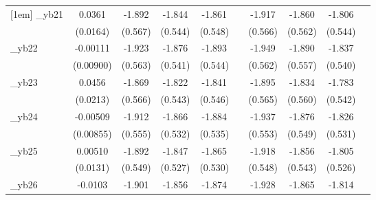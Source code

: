 \begin{table}[htbp]
\begin{tabular}{l*{9}{c}}
[1em]
\_yb21       &      0.0361\sym{**} &      -1.892\sym{***}&      -1.844\sym{***}&      -1.861\sym{***}&                     &      -1.917\sym{***}&      -1.860\sym{***}&      -1.806\sym{***}&                     \\
            &    (0.0164)         &     (0.567)         &     (0.544)         &     (0.548)         &                     &     (0.566)         &     (0.562)         &     (0.544)         &                     \\
[1em]
\_yb22       &    -0.00111         &      -1.923\sym{***}&      -1.876\sym{***}&      -1.893\sym{***}&                     &      -1.949\sym{***}&      -1.890\sym{***}&      -1.837\sym{***}&                     \\
            &   (0.00900)         &     (0.563)         &     (0.541)         &     (0.544)         &                     &     (0.562)         &     (0.557)         &     (0.540)         &                     \\
[1em]
\_yb23       &      0.0456\sym{**} &      -1.869\sym{***}&      -1.822\sym{***}&      -1.841\sym{***}&                     &      -1.895\sym{***}&      -1.834\sym{***}&      -1.783\sym{***}&                     \\
            &    (0.0213)         &     (0.566)         &     (0.543)         &     (0.546)         &                     &     (0.565)         &     (0.560)         &     (0.542)         &                     \\
[1em]
\_yb24       &    -0.00509         &      -1.912\sym{***}&      -1.866\sym{***}&      -1.884\sym{***}&                     &      -1.937\sym{***}&      -1.876\sym{***}&      -1.826\sym{***}&                     \\
            &   (0.00855)         &     (0.555)         &     (0.532)         &     (0.535)         &                     &     (0.553)         &     (0.549)         &     (0.531)         &                     \\
[1em]
\_yb25       &     0.00510         &      -1.892\sym{***}&      -1.847\sym{***}&      -1.865\sym{***}&                     &      -1.918\sym{***}&      -1.856\sym{***}&      -1.805\sym{***}&                     \\
            &    (0.0131)         &     (0.549)         &     (0.527)         &     (0.530)         &                     &     (0.548)         &     (0.543)         &     (0.526)         &                     \\
[1em]
\_yb26       &     -0.0103         &      -1.901\sym{***}&      -1.856\sym{***}&      -1.874\sym{***}&                     &      -1.928\sym{***}&      -1.865\sym{***}&      -1.814\sym{***}&                     \\

\end{tabular}
\end{table}

